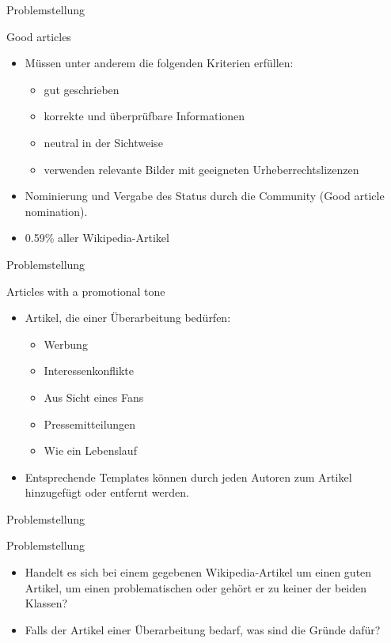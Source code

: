 \documentclass[aspectratio=169]{beamer} %
\begin{document}
\begin{frame}{Problemstellung}
    \begin{block}{Good articles}
        \begin{itemize}
            \item Müssen unter anderem die folgenden Kriterien erfüllen:
                  \begin{itemize}
                      \item gut geschrieben
                      \item korrekte und überprüfbare Informationen
                      \item neutral in der Sichtweise
                      \item verwenden relevante Bilder mit geeigneten Urheberrechtslizenzen
                  \end{itemize}
            \item Nominierung und Vergabe des Status durch die Community (Good article nomination).
            \item 0.59\% aller Wikipedia-Artikel
        \end{itemize}
    \end{block}
\end{frame}

\begin{frame}{Problemstellung}
    \begin{block}{Articles with a promotional tone}
        \begin{itemize}
            \item Artikel, die einer Überarbeitung bedürfen:
                  \begin{itemize}
                      \item Werbung
                      \item Interessenkonflikte
                      \item Aus Sicht eines Fans
                      \item Pressemitteilungen
                      \item Wie ein Lebenslauf
                  \end{itemize}
            \item Entsprechende Templates können durch jeden Autoren zum Artikel hinzugefügt oder entfernt werden.
        \end{itemize}
    \end{block}
\end{frame}

\begin{frame}{Problemstellung}
    \begin{block}{Problemstellung}
        \begin{itemize}
            \item Handelt es sich bei einem gegebenen Wikipedia-Artikel um einen guten Artikel, um einen problematischen oder gehört er zu keiner der beiden Klassen?
            \item Falls der Artikel einer Überarbeitung bedarf, was sind die Gründe dafür?
        \end{itemize}
    \end{block}
\end{frame}
\end{document}
